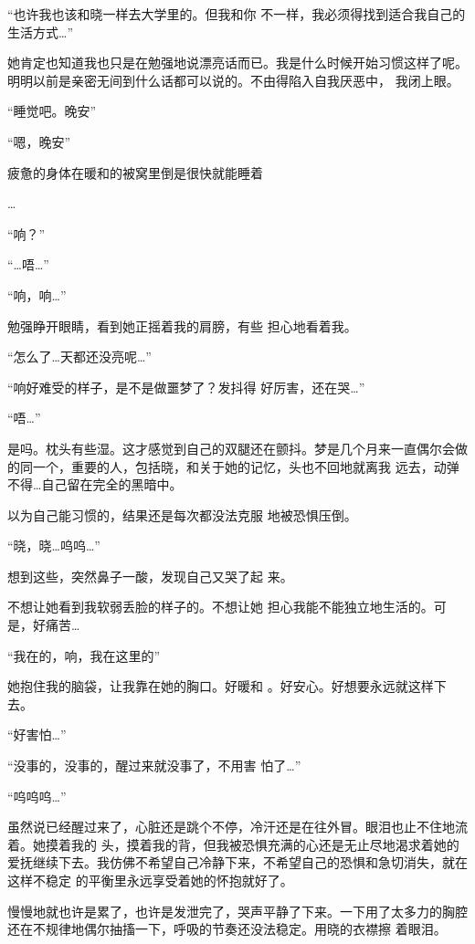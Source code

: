 \documentclass{article}
\begin{document}
\newpage

“也许我也该和晓一样去大学里的。但我和你
不一样，我必须得找到适合我自己的生活方式…” 


她肯定也知道我也只是在勉强地说漂亮话而已。我是什么时候开始习惯这样了呢。明明以前是亲密无间到什么话都可以说的。不由得陷入自我厌恶中，
我闭上眼。 


“睡觉吧。晚安” 


“嗯，晚安” 

疲惫的身体在暖和的被窝里倒是很快就能睡着


… 


“响？” 


“…唔…” 

\newpage


“响，响…” 

勉强睁开眼睛，看到她正摇着我的肩膀，有些
担心地看着我。 


“怎么了…天都还没亮呢…” 

“响好难受的样子，是不是做噩梦了？发抖得
好厉害，还在哭…” 


“唔…” 

是吗。枕头有些湿。这才感觉到自己的双腿还在颤抖。梦是几个月来一直偶尔会做的同一个，重要的人，包括晓，和关于她的记忆，头也不回地就离我
远去，动弹不得…自己留在完全的黑暗中。 

以为自己能习惯的，结果还是每次都没法克服
地被恐惧压倒。 


\newpage

“晓，晓…呜呜…” 

想到这些，突然鼻子一酸，发现自己又哭了起
来。 

不想让她看到我软弱丢脸的样子的。不想让她
担心我能不能独立地生活的。可是，好痛苦… 


“我在的，响，我在这里的” 

她抱住我的脑袋，让我靠在她的胸口。好暖和
。好安心。好想要永远就这样下去。 


“好害怕…” 

“没事的，没事的，醒过来就没事了，不用害
怕了…” 


“呜呜呜…” 

虽然说已经醒过来了，心脏还是跳个不停，冷汗还是在往外冒。眼泪也止不住地流着。她摸着我的
\newpage
头，摸着我的背，但我被恐惧充满的心还是无止尽地渴求着她的爱抚继续下去。我仿佛不希望自己冷静下来，不希望自己的恐惧和急切消失，就在这样不稳定
的平衡里永远享受着她的怀抱就好了。 

慢慢地就也许是累了，也许是发泄完了，哭声平静了下来。一下用了太多力的胸腔还在不规律地偶尔抽搐一下，呼吸的节奏还没法稳定。用晓的衣襟擦
着眼泪。 
\end{document}
